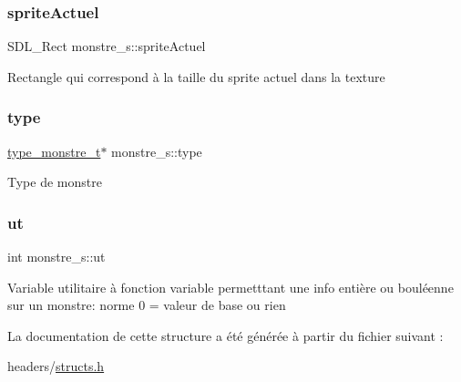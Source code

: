 \subsubsection{\texorpdfstring{sprite\+Actuel}{spriteActuel}}
{\footnotesize\ttfamily S\+D\+L\+\_\+\+Rect monstre\+\_\+s\+::sprite\+Actuel}

Rectangle qui correspond à la taille du sprite actuel dans la texture \mbox{\label{structmonstre__s_af58fb0da12d89fbdce602578f457560e}} 
\subsubsection{\texorpdfstring{type}{type}}
{\footnotesize\ttfamily \hyperlink{structtype__monstre__s}{type\+\_\+monstre\+\_\+t}$\ast$ monstre\+\_\+s\+::type}

Type de monstre \mbox{\label{structmonstre__s_a0829b1dda3db793b717fa93466a686c6}} 
\subsubsection{\texorpdfstring{ut}{ut}}
{\footnotesize\ttfamily int monstre\+\_\+s\+::ut}

Variable utilitaire à fonction variable permetttant une info entière ou bouléenne sur un monstre\+: norme 0 = valeur de base ou rien 

La documentation de cette structure a été générée à partir du fichier suivant \+:\begin{DoxyCompactItemize}
\item 
headers/\hyperlink{structs_8h}{structs.\+h}\end{DoxyCompactItemize}
